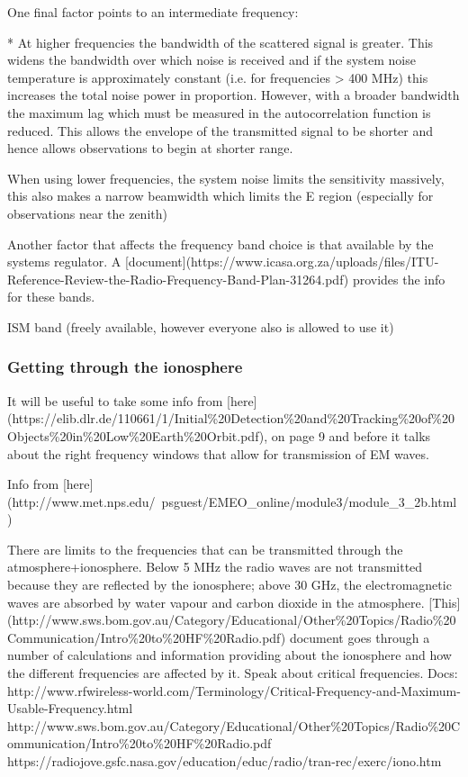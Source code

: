 \documentclass[11pt]{witseiepaper}
\begin{document}
One final factor points to an intermediate frequency:

    * At higher frequencies the bandwidth of the scattered signal is greater. This widens the bandwidth over which noise is received and if the system noise temperature is approximately constant (i.e. for frequencies > 400 MHz) this increases the total noise power in proportion. However, with a broader bandwidth the maximum lag which must be measured in the autocorrelation function is reduced. This allows the envelope of the transmitted signal to be shorter and hence allows observations to begin at shorter range.

When using lower frequencies, the system noise limits the sensitivity massively, this also makes a narrow beamwidth which limits the E region (especially for observations near the zenith)

Another factor that affects the frequency band choice is that available by the systems regulator. A [document](https://www.icasa.org.za/uploads/files/ITU-Reference-Review-the-Radio-Frequency-Band-Plan-31264.pdf) provides the info for these bands.

ISM band (freely available, however everyone also is allowed to use it)

\subsubsection{Getting through the ionosphere}

It will be useful to take some info from [here](https://elib.dlr.de/110661/1/Initial\%20Detection\%20and\%20Tracking\%20of\%20Objects\%20in\%20Low\%20Earth\%20Orbit.pdf), on page 9 and before it talks about the right frequency windows that allow for transmission of EM waves.

Info from [here](http://www.met.nps.edu/~psguest/EMEO\_online/module3/module\_3\_2b.html)

There are limits to the frequencies that can be transmitted through the atmosphere+ionosphere. Below 5 MHz the radio waves are not transmitted because they are reflected by the ionosphere; above 30 GHz, the electromagnetic waves are absorbed by water vapour and carbon dioxide in the atmosphere.
[This](http://www.sws.bom.gov.au/Category/Educational/Other\%20Topics/Radio\%20Communication/Intro\%20to\%20HF\%20Radio.pdf) document goes through a number of calculations and information providing about the ionosphere and how the different frequencies are affected by it.
Speak about critical frequencies.
Docs: http://www.rfwireless-world.com/Terminology/Critical-Frequency-and-Maximum-Usable-Frequency.html
http://www.sws.bom.gov.au/Category/Educational/Other\%20Topics/Radio\%20Communication/Intro\%20to\%20HF\%20Radio.pdf
https://radiojove.gsfc.nasa.gov/education/educ/radio/tran-rec/exerc/iono.htm
\end{document}
